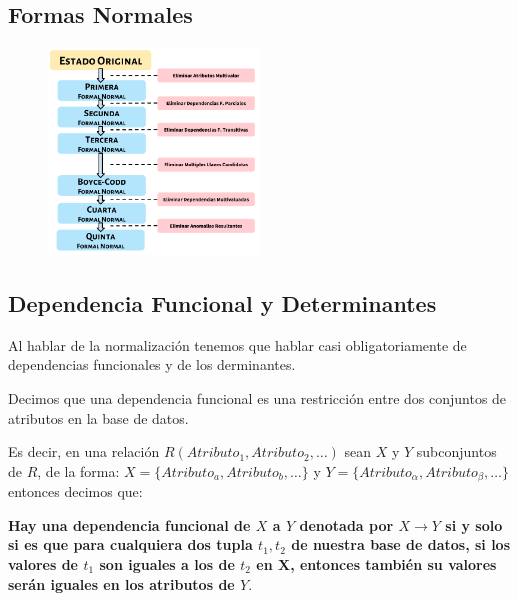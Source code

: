 \documentclass[12pt, fleqn]{report}                             %
\theoremstyle{break}                                            %
\newcommand \lLongTo {\longrightarrow}                          %
\begin{document}
            \subsection{Formas Normales}

                \begin{figure}[h]
                    \centering
                    \includegraphics[width=0.50\textwidth]{Normalizacion}
                \end{figure}



            \clearpage
            \subsection{Dependencia Funcional y Determinantes}

                Al hablar de la normalización tenemos que hablar casi obligatoriamente
                de dependencias funcionales y de los derminantes.

                Decimos que una dependencia funcional es una restricción entre dos conjuntos
                de atributos en la base de datos.

                Es decir, en una relación $R(Atributo_1, Atributo_2, \dots)$ sean $X$ y $Y$ subconjuntos de $R$, de la forma: $X = \{Atributo_a, Atributo_b, \dots\}$ y 
                $Y = \{Atributo_\alpha, Atributo_\beta, \dots\}$ entonces decimos que:

                \textbf{Hay una dependencia funcional de $X$ a $Y$ denotada por $X \lLongTo Y$
                si y solo si es que para cualquiera dos tupla $t_1, t_2$ de nuestra base de
                datos, si los valores de $t_1$ son iguales a los de $t_2$ en X, entonces
                también su valores serán iguales en los atributos de $Y$}.
\end{document}
